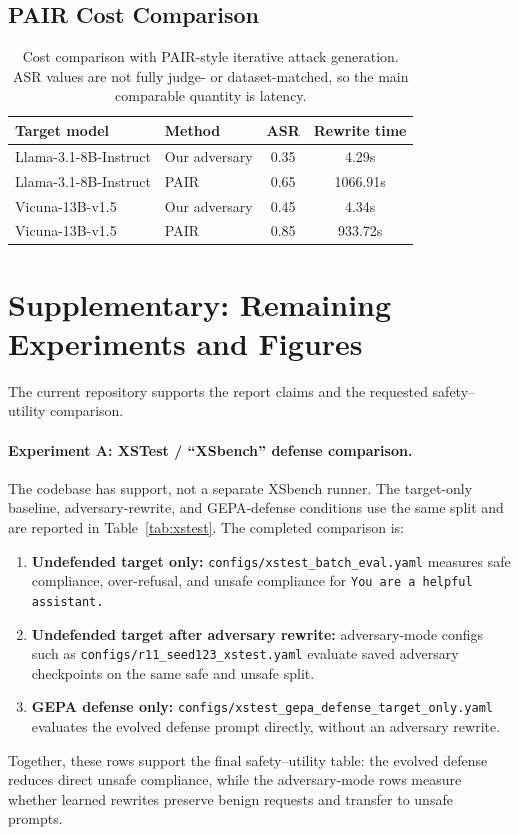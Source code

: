 \subsection{PAIR Cost Comparison}

\begin{table}[h]
\centering
\caption{
Cost comparison with PAIR-style iterative attack generation. 
ASR values are not fully judge- or dataset-matched, so the main comparable quantity is latency.
}
\label{tab:pair}
\begin{tabular}{llcc}
\toprule
Target model & Method & ASR & Rewrite time \\
\midrule
Llama-3.1-8B-Instruct & Our adversary & 0.35 & 4.29s \\
Llama-3.1-8B-Instruct & PAIR & 0.65 & 1066.91s \\
Vicuna-13B-v1.5 & Our adversary & 0.45 & 4.34s \\
Vicuna-13B-v1.5 & PAIR & 0.85 & 933.72s \\
\bottomrule
\end{tabular}
\end{table}

\section{Supplementary: Remaining Experiments and Figures}
\label{sec:remaining-experiments}

The current repository supports the report claims and the requested \xstest{} safety--utility comparison.

\paragraph{Experiment A: XSTest / ``XSbench'' defense comparison.}
The codebase has \xstest{} support, not a separate XSbench runner. 
The target-only baseline, adversary-rewrite, and GEPA-defense conditions use the same \xstest{} split and are reported in Table~\ref{tab:xstest}. 
The completed comparison is:
\begin{enumerate}
    \item \textbf{Undefended target only:} \texttt{configs/xstest\_batch\_eval.yaml} measures safe compliance, over-refusal, and unsafe compliance for \texttt{You are a helpful assistant.}
    \item \textbf{Undefended target after adversary rewrite:} adversary-mode configs such as \texttt{configs/r11\_seed123\_xstest.yaml} evaluate saved adversary checkpoints on the same safe and unsafe \xstest{} split.
    \item \textbf{GEPA defense only:} \texttt{configs/xstest\_gepa\_defense\_target\_only.yaml} evaluates the evolved defense prompt directly, without an adversary rewrite.
\end{enumerate}
Together, these rows support the final safety--utility table: the evolved defense reduces direct unsafe compliance, while the adversary-mode rows measure whether learned rewrites preserve benign requests and transfer to unsafe \xstest{} prompts.

